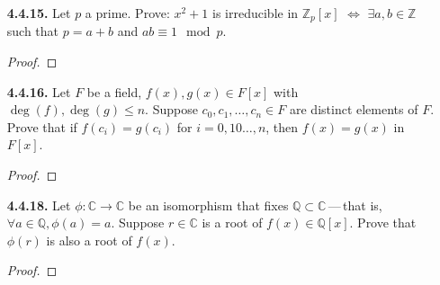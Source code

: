 \documentclass[12pt]{article}
\newcommand{\zee}{\mathbb{Z}}
\newcommand{\Q}{\mathbb{Q}}
\newcommand{\C}{\mathbb{C}}
\begin{document}
\begin{itemize}
\item[\textbf{ 4.4.15.}] Let $p$ a prime. Prove: $x^2+1$ is irreducible in $\zee_p[x]$ $\iff$  $\exists a,b\in\zee$ such that $p=a+b$ and $ab\equiv 1\mod p$.
\begin{proof}
\end{proof}

\item[\textbf{ 4.4.16.}] Let $F$ be a field, $f(x), g(x)\in F[x]$ with $\deg(f), \deg(g)\le n$. Suppose $c_0,c_1,\dotsc, c_n\in F$ are distinct elements of $F$.  Prove that if $f(c_i)=g(c_i)$ for $i=0,10\dotsc,n$, then $f(x)=g(x)$ in $F[x]$.
\begin{proof}
\end{proof}

\item[\textbf{ 4.4.18.}] Let $\phi:\C \to \C$ be an isomorphism that fixes $\Q\subset \C$\,---\,that is, $\forall a\in\Q, \phi(a)=a$. Suppose $r\in\C$ is a root of $f(x)\in \Q[x]$. Prove that $\phi(r)$ is also a root of $f(x)$.
\begin{proof}
\end{proof}

\end{itemize}
\end{document}
